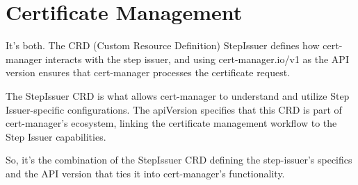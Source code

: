 \chapter{Certificate Management}

It’s both. The CRD (Custom Resource Definition) StepIssuer defines how cert-manager interacts with the step issuer, and using cert-manager.io/v1 as the API version ensures that cert-manager processes the certificate request.

The StepIssuer CRD is what allows cert-manager to understand and utilize Step Issuer-specific configurations. The apiVersion specifies that this CRD is part of cert-manager’s ecosystem, linking the certificate management workflow to the Step Issuer capabilities.

So, it’s the combination of the StepIssuer CRD defining the step-issuer's specifics and the API version that ties it into cert-manager’s functionality.